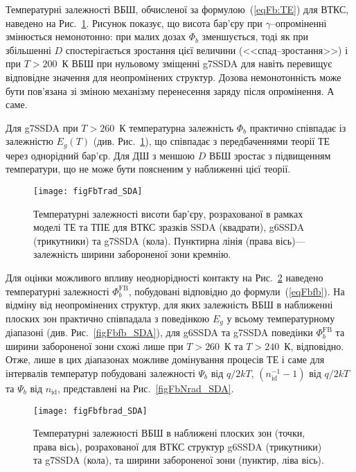 Температурні залежності ВБШ, обчисленої за формулою~(\ref{eqFb:TE}) для ВТКС, наведено на Рис.~\ref{figFbTrad_SDA}.
Рисунок показує, що висота бар'єру при $\gamma$--опроміненні змінюється немонотонно:
при малих дозах $\Phi_b$ зменшується, тоді як при збільшенні $D$ спостерігається зростання цієї величини (<<спад--зростання>>) і
при $T>200$~К ВБШ при нульовому зміщенні g7SSDA для навіть перевищує відповідне значення для неопромінених структур.
Дозова немонотонність може бути пов'язана зі зміною механізму перенесення заряду після опромінення.
А саме.

Для g7SSDA при $T>260$~К температурна залежність $\Phi_b$ практично співпадає із залежністю $E_g(T)$ (див. Рис.~\ref{figFbTrad_SDA}),
що співпадає з передбаченнями теорії ТЕ через однорідний бар'єр.
Для ДШ з меншою $D$ ВБШ зростає з підвищенням температури, що не може бути поясненим у наближенні цієї теорії.


\begin{figure}
\center
\texttt{[image: figFbTrad\_SDA]}
\caption{\label{figFbTrad_SDA}
Температурні залежності висоти бар'єру, розрахованої в рамках моделі ТЕ та ТПЕ
для ВТКС зразків SSDA (квадрати),
g6SSDA (трикутники) та g7SSDA (кола).
Пунктирна лінія (права вісь)--- залежність ширини забороненої зони кремнію.
}%
\end{figure}


Для оцінки можливого впливу неоднорідності контакту на Рис.~\ref{figFbfbrad_SDA} наведено температурні
залежності  $\Phi_{b}^\mathrm{FB}$, побудовані відповідно до формули~(\ref{eqFbfb}).
На відміну від неопромінених структур, для яких залежність ВБШ в наближенні плоских зон практично співпадала
з поведінкою $E_g$ у всьому температурному діапазоні (див. Рис.~\ref{figFbfb_SDA}),
для g6SSDA  та g7SSDA поведінки $\Phi_{b}^\mathrm{FB}$ та ширини забороненої зони схожі лише при $T>260$~К та $T>240$~К, відповідно.
Отже, лише в цих діапазонах можливе домінування процесів ТЕ і саме для інтервалів температур побудовані
залежності $\Psi_b$ від $q/2kT$, $(n_\mathrm{id}^{-1}-1)$ від $q/2kT$ та $\Psi_b$ від $n_\mathrm{id}$,
представлені на
Рис.~\ref{figFbNrad_SDA}.

\begin{figure}
\center
\texttt{[image: figFbfbrad\_SDA]}
\caption{\label{figFbfbrad_SDA}
Температурні залежності ВБШ в наближені плоских зон (точки, права вісь), розрахованої
для ВТКС структур
g6SSDA (трикутники) та g7SSDA (кола),
та ширини забороненої зони (пунктир, ліва вісь).
}%
\end{figure}




